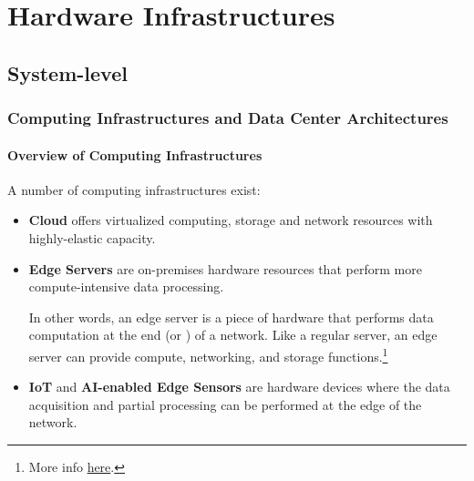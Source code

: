\section{Hardware Infrastructures}

\subsection{System-level}

\subsubsection{Computing Infrastructures and Data Center Architectures}

\paragraph{Overview of Computing Infrastructures}

\noindent
A number of computing infrastructures exist:
\begin{itemize}
    \item \textbf{Cloud} offers virtualized computing, storage and network resources with highly-elastic capacity.
    
    
    \item \textbf{Edge Servers} are on-premises hardware resources that perform more compute-intensive data processing.
    
    In other words, an edge server is a piece of hardware that performs data computation at the end (or ) of a network. Like a regular server, an edge server can provide compute, networking, and storage functions.\footnote{More info \href{https://phoenixnap.com/blog/edge-server}{here}.}

    
    \item \textbf{IoT} and \textbf{AI-enabled Edge Sensors} are hardware devices where the data acquisition and partial processing can be performed at the edge of the network.
\end{itemize}

